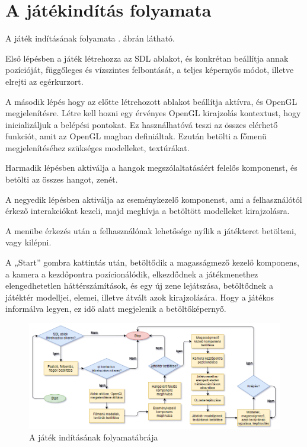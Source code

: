 \section{A játékindítás folyamata}

A játék indításának folyamata . ábrán látható.

Első lépésben a játék létrehozza az SDL ablakot, és konkrétan beállítja annak pozícióját, függőleges és vízszintes felbontását, a teljes képernyős módot, illetve elrejti az egérkurzort.

A második lépés hogy az előtte létrehozott ablakot beállítja aktívra, és OpenGL megjelenítésre. Létre kell hozni egy érvényes OpenGL kirajzolás kontextust, hogy inicializáljuk a belépési pontokat. Ez használhatóvá teszi az összes elérhető funkciót, amit az OpenGL magban definiáltak. Ezután betölti a főmenü megjelenítéséhez szükséges modelleket, textúrákat.

Harmadik lépésben aktiválja a hangok megszólaltatásáért felelős komponenst, és betölti az összes hangot, zenét.

A negyedik lépésben aktiválja az eseménykezelő komponenst, ami a felhasználótól érkező interakciókat kezeli, majd meghívja a betöltött modelleket kirajzolásra.

A menübe érkezés után a felhasználónak lehetősége nyílik a játékteret betölteni, vagy kilépni. 

A „Start” gombra kattintás után, betöltődik a magasságmező kezelő komponens, a kamera a kezdőpontra pozícionálódik, elkezdődnek a játékmenethez elengedhetetlen háttérszámítások, és egy új zene lejátszása, betöltődnek a játéktér modelljei, elemei, illetve átvált azok kirajzolására. Hogy a játékos informálva legyen, ez idő alatt megjelenik a betöltőképernyő.

\begin{figure}[h]
\centering
\includegraphics[scale=0.46]{kepek/starting_diagram.png}
\caption{A játék indításának folyamatábrája}
\label{fig:starting}
\end{figure}

